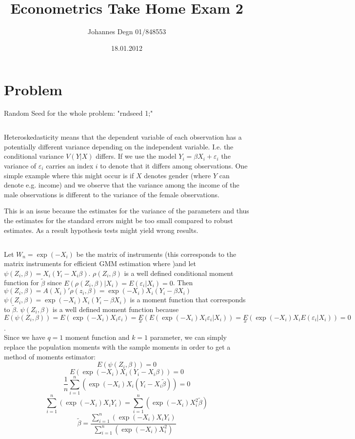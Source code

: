 \documentclass[11pt]{article}
\title{\textbf{Econometrics Take Home Exam 2}}
\author{Johannes Degn 01/848553}
\date{18.01.2012}
\theoremstyle{break}
\begin{document}
\maketitle


\section{Problem}
Random Seed for the whole problem: "rndseed 1;"

\subsection{}
Heteroskedasticity means that the dependent variable of each observation has a potentially different variance depending on the independent variable. I.e. the conditional variance $V(Y|X)$ differs. If we use the model $Y_i = \beta X_i + \varepsilon_i$ the variance of $\varepsilon_i$ carries an index $i$ to denote that it differs among observations. One simple example where this might occur is if $X$ denotes gender (where $Y$ can denote e.g. income) and we observe that the variance among the income of the male observations is different to the variance of the female observations.

This is an issue because the estimates for the variance of the parameters and thus the estimates for the standard errors might be too small compared to robust estimates. As a result hypothesis tests might yield wrong results.


\subsection{}
Let $W_n = \exp(-X_i)$ be the matrix of instruments (this corresponds to the matrix instruments for efficient GMM estimation where )and let $\psi(Z_i, \beta) = X_i(Y_i-X_i\beta)$. $\rho(Z_i, \beta)$ is a well defined conditional moment function for $\tilde{\beta}$ since $E(\rho(Z_i, \beta)| X_i) = E(\varepsilon_i | X_i) = 0$. Then $\psi(Z_i, \beta) = A(X_i)'\rho(z_i, \beta) = \exp(-X_i)X_i(Y_i-\beta X_i)$
\\
$\psi(Z_i, \beta) = \exp(-X_i)X_i(Y_i - \beta X_i)$ is a moment function that corresponds to $\tilde{\beta}$. $\psi(Z_i, \beta)$ is a well defined moment function because $E(\psi(Z_i, \beta)) = E(\exp(-X_i)X_i\varepsilon_i) = \underset{x}{E}(E(\exp(-X_i)X_i\varepsilon_i|X_i)) = \underset{x}{E}(\exp(-X_i)X_iE(\varepsilon_i|X_i)) = 0$. \\

Since we have $q=1$ moment function and $k=1$ parameter, we can simply replace the population moments with the sample moments in order to get a method of moments estimator: \\
$$E(\psi(Z_i, \beta)) = 0$$
$$E(\exp(-X_i)X_i(Y_i -X_i\beta)) = 0$$
$$\frac{1}{n}\displaystyle \sum_{i=1}^n(\exp(-X_i)X_i(Y_i -X_i\tilde{\beta})) = 0$$
$$\displaystyle \sum_{i=1}^n(\exp(-X_i)X_iY_i) = \displaystyle \sum_{i=1}^n(\exp(-X_i)X_i^2\tilde{\beta})$$
$$\tilde{\beta} = \frac{\sum_{i=1}^n(\exp(-X_i)X_iY_i)}{\sum_{i=1}^n(\exp(-X_i)X_i^2
)}$$
\end{document}
